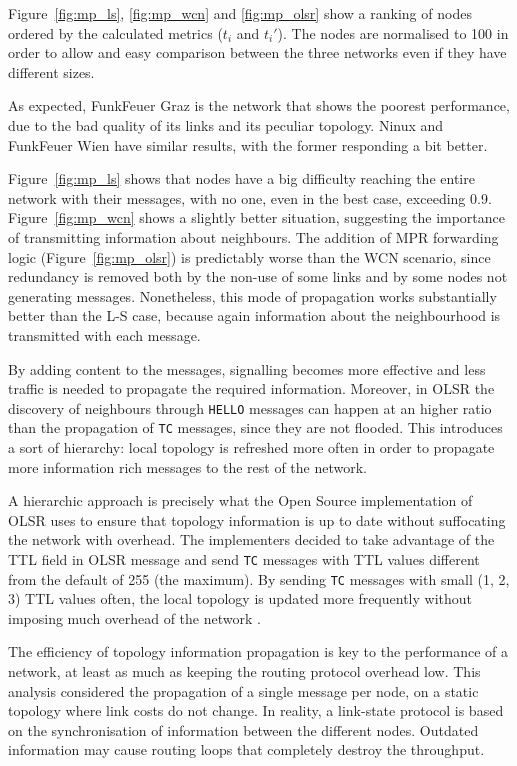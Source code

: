 \documentclass[a4paper,11pt,twoside,openright]{memoir}
\newcommand{\figref}[1] {Figure~\ref{#1}}
\begin{document}
\figref{fig:mp_ls}, \ref{fig:mp_wcn} and \ref{fig:mp_olsr} show a ranking of
nodes ordered by the calculated metrics ($t_i$ and $t_i'$). The nodes are
normalised to 100 in order to allow and easy comparison between the three
networks even if they have different sizes.

As expected, FunkFeuer Graz is the network that shows the poorest performance,
due to the bad quality of its links and its peculiar topology. Ninux and
FunkFeuer Wien have similar results, with the former responding a bit better.

\figref{fig:mp_ls} shows that nodes have a big difficulty reaching the entire
network with their messages, with no one, even in the best case, exceeding 0.9.
\figref{fig:mp_wcn} shows a slightly better situation, suggesting 
the importance of transmitting information about neighbours.
The addition of MPR forwarding logic (\figref{fig:mp_olsr})
is predictably worse than the WCN scenario,
since redundancy is removed both by the non-use of some links and by some nodes
not generating messages. Nonetheless, this mode of propagation works
substantially better than the L-S case, because again information about the
neighbourhood is transmitted with each message.

By adding content to the messages, signalling becomes more effective and
less traffic is needed to propagate the required information.
Moreover, in OLSR the discovery of neighbours through \texttt{HELLO}
messages can happen at an higher ratio than the propagation of \texttt{TC}
messages, since they are not flooded.
This introduces a sort of hierarchy: local topology is refreshed more often
in order to propagate more information rich messages to the rest of the network.

A hierarchic approach is precisely what the Open Source implementation of OLSR
uses to ensure that topology information is up to date without suffocating
the network with overhead. The implementers decided to take advantage of the
TTL field in OLSR message and send \texttt{TC} messages with TTL values
different from the default of 255 (the maximum). By sending \texttt{TC}
messages with small (1, 2, 3) TTL values often, the local topology is
updated more frequently without imposing much overhead of the network
\cite{_olsr_????}.

The efficiency of topology information propagation is key to the performance of
a network, at least as much as keeping the routing protocol overhead low.
This analysis considered the propagation of a single message per node, on a
static topology where link costs do not change.
In reality, a link-state protocol is based on the synchronisation of information
between the different nodes. Outdated information may cause routing loops that
completely destroy the throughput.
\end{document}
